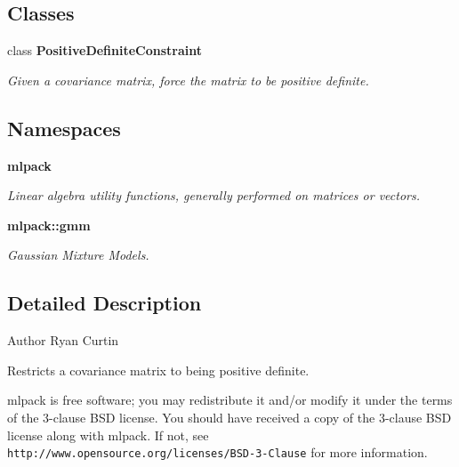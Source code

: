 \subsection*{Classes}
\begin{DoxyCompactItemize}
\item 
class \textbf{ Positive\+Definite\+Constraint}
\begin{DoxyCompactList}\small\item\em Given a covariance matrix, force the matrix to be positive definite. \end{DoxyCompactList}\end{DoxyCompactItemize}
\subsection*{Namespaces}
\begin{DoxyCompactItemize}
\item 
 \textbf{ mlpack}
\begin{DoxyCompactList}\small\item\em Linear algebra utility functions, generally performed on matrices or vectors. \end{DoxyCompactList}\item 
 \textbf{ mlpack\+::gmm}
\begin{DoxyCompactList}\small\item\em Gaussian Mixture Models. \end{DoxyCompactList}\end{DoxyCompactItemize}


\subsection{Detailed Description}
\begin{DoxyAuthor}{Author}
Ryan Curtin
\end{DoxyAuthor}
Restricts a covariance matrix to being positive definite.

mlpack is free software; you may redistribute it and/or modify it under the terms of the 3-\/clause B\+SD license. You should have received a copy of the 3-\/clause B\+SD license along with mlpack. If not, see {\tt http\+://www.\+opensource.\+org/licenses/\+B\+S\+D-\/3-\/\+Clause} for more information. 